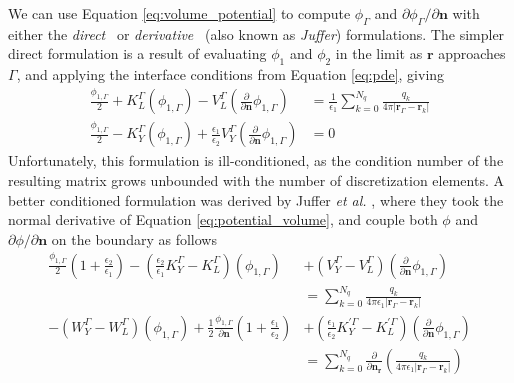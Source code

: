 We can use Equation \eqref{eq:volume_potential} to compute $\phi_\Gamma$ and $\partial\phi_\Gamma/\partial\mathbf{n}$ with either the \emph{direct}~\cite{YoonLenhoff1990} or \emph{derivative}~\cite{JufferETal1991} (also known as \emph{Juffer}) formulations.
The simpler direct formulation is a result of evaluating $\phi_1$ and $\phi_2$ in the limit as $\mathbf{r}$ approaches $\Gamma$, and applying the interface conditions from Equation \eqref{eq:pde}, giving
%
\begin{align} \label{eq:direct}
\frac{\phi_{1,\Gamma}}{2}+ K_{L}^{\Gamma}(\phi_{1,\Gamma}) -  V_{L}^{\Gamma} \left(\frac{\partial}{\partial \mathbf{n}}  \phi_{1,\Gamma}  \right) & = \frac{1}{\epsilon_1} \sum_{k=0}^{N_q}  \frac{q_k}{4\pi|\mathbf{r}_{\Gamma} - \mathbf{r}_k|} \nonumber \\
\frac{\phi_{1,\Gamma}}{2} - K_{Y}^{\Gamma}(\phi_{1,\Gamma}) + \frac{\epsilon_1}{\epsilon_2}V_{Y}^{\Gamma} \left( \frac{\partial}{\partial \mathbf{n}} \phi_{1,\Gamma} \right) & = 0
\end{align}
%
Unfortunately, this formulation is ill-conditioned, as the condition number of the resulting matrix grows unbounded with the number of discretization elements. 
A better conditioned formulation was derived by Juffer \emph{et al.} \cite{JufferETal1992}, where they took the normal derivative of Equation \eqref{eq:potential_volume}, and couple both $\phi$ and $\partial\phi/\partial\mathbf{n}$ on the boundary as follows
%
\begin{align}\label{eq:juffer}
\frac{\phi_{1,\Gamma}}{2}\left(1+\frac{\epsilon_2}{\epsilon_1}\right) - \left(\frac{\epsilon_2}{\epsilon_1}K_Y^\Gamma - K_L^\Gamma\right)(\phi_{1,\Gamma}) &+ \left(V_Y^\Gamma - V_L^\Gamma\right)\left( \frac{\partial}{\partial \mathbf{n}} \phi_{1,\Gamma} \right)\nonumber\\ 
&= \sum_{k=0}^{N_q}  \frac{q_k}{4\pi\epsilon_1|\mathbf{r}_{\Gamma} - \mathbf{r}_k|} \nonumber \\
- \left(W_Y^\Gamma - W_L^\Gamma\right)(\phi_{1,\Gamma}) +  \frac{1}{2}\frac{\phi_{1,\Gamma}}{\partial\mathbf{n}}\left(1+\frac{\epsilon_1}{\epsilon_2}\right) &+ \left(\frac{\epsilon_1}{\epsilon_2}K_Y^{\prime\Gamma} - K_L^{\prime\Gamma}\right)\left( \frac{\partial}{\partial \mathbf{n}} \phi_{1,\Gamma} \right)\nonumber\\ 
&= \sum_{k=0}^{N_q}  \frac{\partial}{\partial\mathbf{n}_\mathbf{r}}\left(\frac{q_k}{4\pi\epsilon_1|\mathbf{r}_{\Gamma} - \mathbf{r}_k|}\right) \nonumber \\
\end{align}

